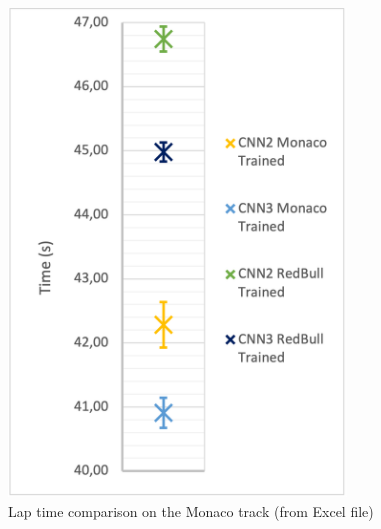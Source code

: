 \begin{figure}
    \centering
    \begin{minipage}{0.45\textwidth}
        \centering
        \includegraphics[width=0.8\textwidth]{Figures/H3_Time.png}
        \caption{Lap time comparison on the Monaco track (from Excel file)}
        \label{h3_time}
    \end{minipage}\hfill
    \begin{minipage}{0.45\textwidth}
        \centering

\end{minipage}
\end{figure}

